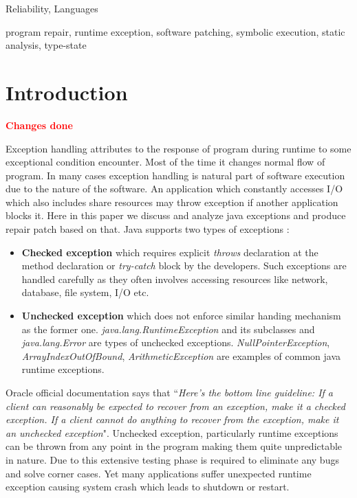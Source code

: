\documentclass{sigplanconf}
\begin{document}

\terms
Reliability, Languages 

\keywords
program repair, runtime exception, software patching, symbolic execution, static analysis, type-state

\section{Introduction}
\label{sec:intro}

\textcolor{red}{\textbf{Changes done}}\newline

Exception handling attributes to the response of program during runtime to some exceptional condition encounter. 
Most of the time it changes normal flow of program. In many cases exception handling is natural part of software execution 
due to the nature of the software. 
An application which constantly accesses I/O which also includes share resources may throw exception if another application blocks it. 
Here in this paper we discuss and analyze java exceptions and produce repair patch based on that. Java supports two types of exceptions : 
\begin{itemize}
	
	\item \textbf{Checked exception} which requires explicit \emph{throws} declaration at the method declaration or \emph{try-catch} 
	block by the developers. Such exceptions are handled carefully as they often involves accessing resources like network, database, 
	file system, I/O etc. 
	
	\item \textbf{Unchecked exception} which does not enforce similar handing mechanism as the former one. \emph{java.lang.RuntimeException} 
	and its subclasses and \emph{java.lang.Error} are types of unchecked exceptions. \emph{NullPointerException}, \emph{ArrayIndexOutOfBound}, 
	\emph{ArithmeticException} are examples of common java runtime exceptions.

\end{itemize}

Oracle official documentation says that ``\emph{Here's the bottom line guideline: If a client can reasonably be expected to recover from an exception,
 make it a checked exception. If a client cannot do anything to recover from the exception, make it an unchecked exception}".  
 Unchecked exception, particularly runtime exceptions can be thrown from any point in the program making them quite unpredictable in nature. 
 Due to this extensive testing phase is required to eliminate any bugs and solve corner cases. 
 Yet many applications suffer unexpected runtime exception causing system crash which leads to shutdown or restart.
\end{document}
